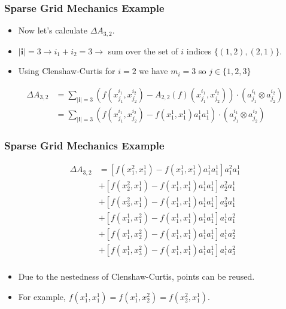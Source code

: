 \documentclass{beamer}
\begin{document}
\begin{frame}
\frametitle{Sparse Grid Mechanics Example}

\begin{itemize}
  \item Now let's calculate $\Delta A_{3,2}$. 
  \item $\vert\textbf{i}\vert=3 \rightarrow i_1 + i_2 = 3 \rightarrow$ sum over the set of $i$ indices $\lbrace (1, 2), (2, 1) \rbrace$.
  \item Using Clenshaw-Curtis for $i=2$ we have $m_i=3$ so $j\in \lbrace 1,2,3\rbrace$
\end{itemize}

\begin{align*}
 \Delta A_{3,2} &= \sum_{\vert\textbf{i}\vert=3}
  \left(f(x_{j_1}^{i_1},x_{j_2}^{i_2}) - 
  A_{2,2}(f)(x_{j_1}^{i_1}, x_{j_2}^{i_2})\right)\cdot
  \left(a_{j_1}^{i_1}\otimes a_{j_2}^{i_2}\right) \\ 
 &= \sum_{\vert\textbf{i}\vert=3}
  \left(f(x_{j_1}^{i_1},x_{j_2}^{i_2}) - 
  f\left( x_{1}^{1},x_{1}^{1}\right)a_{1}^{1}a_{1}^{1}\right)\cdot
  \left(a_{j_1}^{i_1}\otimes a_{j_2}^{i_2}\right)
\end{align*}

\end{frame}
\begin{frame}
\frametitle{Sparse Grid Mechanics Example}

\begin{align*}
 \Delta A_{3,2} &= \left[f(x_{1}^{2},x_{1}^{1}) -
  f\left(x_{1}^{1},x_{1}^{1}\right)a_{1}^{1}a_{1}^{1}\right]a_{1}^{2}a_{1}^{1} \\
  &+ \left[f(x_{2}^{2},x_{1}^{1}) -
  f\left(x_{1}^{1},x_{1}^{1}\right)a_{1}^{1}a_{1}^{1}\right]a_{2}^{2}a_{1}^{1} \\ 
  &+ \left[f(x_{3}^{2},x_{1}^{1}) -
  f\left(x_{1}^{1},x_{1}^{1}\right)a_{1}^{1}a_{1}^{1}\right]a_{3}^{2}a_{1}^{1} \\  
  &+ \left[f(x_{1}^{1},x_{1}^{2}) -
  f\left(x_{1}^{1},x_{1}^{1}\right)a_{1}^{1}a_{1}^{1}\right]a_{1}^{1}a_{1}^{2} \\
  &+ \left[f(x_{1}^{1},x_{2}^{2}) -
  f\left(x_{1}^{1},x_{1}^{1}\right)a_{1}^{1}a_{1}^{1}\right]a_{1}^{1}a_{2}^{2} \\
  &+ \left[f(x_{1}^{1},x_{3}^{2}) -
  f\left(x_{1}^{1},x_{1}^{1}\right)a_{1}^{1}a_{1}^{1}\right]a_{1}^{1}a_{3}^{2} \\  
\end{align*}

\begin{itemize}
  \item Due to the nestedness of Clenshaw-Curtis, points can be reused.
  \item For example, $f(x_1^1, x_1^1) = f(x_1^1, x_2^2) = f(x_2^2, x_1^1)$.
\end{itemize}

\end{frame}
\end{document}
